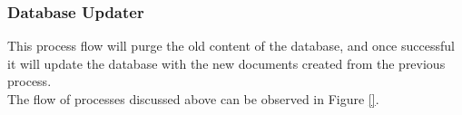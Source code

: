 \subsubsection{Database Updater}
\label{subsubsec:db_updater}
This process flow will purge the old content of 
the database, and once successful it will update the database with the 
new documents created from the previous process.
\vspace{0.5cm}
\\The flow of processes discussed above can be observed 
in Figure \ref{}.
